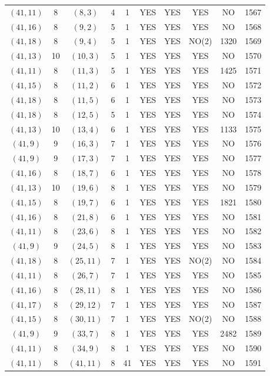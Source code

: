 \begin{longtable}{|c|c|c|c|c|c|c|c|c|c|}
$(41, 11)$ & 8 & $(8, 3)$ & 4 & 1 & YES & YES & YES & NO & 1567\\
$(41, 16)$ & 8 & $(9, 2)$ & 5 & 1 & YES & YES & YES & NO & 1568\\
$(41, 18)$ & 8 & $(9, 4)$ & 5 & 1 & YES & YES & NO(2) & 1320 & 1569\\
$(41, 13)$ & 10 & $(10, 3)$ & 5 & 1 & YES & YES & YES & NO & 1570\\
$(41, 11)$ & 8 & $(11, 3)$ & 5 & 1 & YES & YES & YES & 1425 & 1571\\
$(41, 15)$ & 8 & $(11, 2)$ & 6 & 1 & YES & YES & YES & NO & 1572\\
$(41, 18)$ & 8 & $(11, 5)$ & 6 & 1 & YES & YES & YES & NO & 1573\\
$(41, 18)$ & 8 & $(12, 5)$ & 5 & 1 & YES & YES & YES & NO & 1574\\
$(41, 13)$ & 10 & $(13, 4)$ & 6 & 1 & YES & YES & YES & 1133 & 1575\\
$(41, 9)$ & 9 & $(16, 3)$ & 7 & 1 & YES & YES & YES & NO & 1576\\
$(41, 9)$ & 9 & $(17, 3)$ & 7 & 1 & YES & YES & YES & NO & 1577\\
$(41, 16)$ & 8 & $(18, 7)$ & 6 & 1 & YES & YES & YES & NO & 1578\\
$(41, 13)$ & 10 & $(19, 6)$ & 8 & 1 & YES & YES & YES & NO & 1579\\
$(41, 15)$ & 8 & $(19, 7)$ & 6 & 1 & YES & YES & YES & 1821 & 1580\\
$(41, 16)$ & 8 & $(21, 8)$ & 6 & 1 & YES & YES & YES & NO & 1581\\
$(41, 11)$ & 8 & $(23, 6)$ & 8 & 1 & YES & YES & YES & NO & 1582\\
$(41, 9)$ & 9 & $(24, 5)$ & 8 & 1 & YES & YES & YES & NO & 1583\\
$(41, 18)$ & 8 & $(25, 11)$ & 7 & 1 & YES & YES & NO(2) & NO & 1584\\
$(41, 11)$ & 8 & $(26, 7)$ & 7 & 1 & YES & YES & YES & NO & 1585\\
$(41, 16)$ & 8 & $(28, 11)$ & 8 & 1 & YES & YES & YES & NO & 1586\\
$(41, 17)$ & 8 & $(29, 12)$ & 7 & 1 & YES & YES & YES & NO & 1587\\
$(41, 15)$ & 8 & $(30, 11)$ & 7 & 1 & YES & YES & NO(2) & NO & 1588\\
$(41, 9)$ & 9 & $(33, 7)$ & 8 & 1 & YES & YES & YES & 2482 & 1589\\
$(41, 11)$ & 8 & $(34, 9)$ & 8 & 1 & YES & YES & YES & NO & 1590\\
$(41, 11)$ & 8 & $(41, 11)$ & 8 & 41 & YES & YES & YES & NO & 1591\\

\end{longtable}
